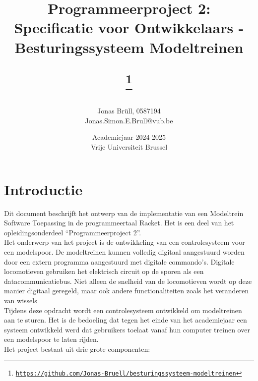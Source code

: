 \documentclass[a4paper, 11pt]{article}
\title{Programmeerproject 2:\\ Specificatie voor Ontwikkelaars - Besturingssysteem Modeltreinen		
	\author{Jonas Br\"ull, 0587194\\ Jonas.Simon.E.Brull@vub.be\\}
	\date{Academiejaar 2024-2025\\Vrije Universiteit Brussel}
	\thanks{\texttt{\url{https://github.com/Jonas-Bruell/besturingssysteem-modeltreinen}}}
}
\newcommand{\<}{\scriptsize\textless\normalsize}
\renewcommand{\>}{\scriptsize\textgreater\normalsize}
\begin{document}
\maketitle
\newpage

\tableofcontents
\newpage

\pagestyle{fancy}
\setcounter{page}{1}

\section{Introductie} %
Dit document beschrijft het ontwerp van de implementatie van een Modeltrein Software Toepassing in de programmeertaal Racket. Het is een deel van het opleidingsonderdeel ``Programmeerproject 2''.\\
\newline
Het onderwerp van het project is de ontwikkeling van een controlesysteem voor een modelspoor. De modeltreinen kunnen volledig digitaal aangestuurd worden door een extern programma aangestuurd met digitale commando’s. Digitale locomotieven gebruiken het elektrisch circuit op de sporen als een datacommunicatiebus. Niet alleen de snelheid van de locomotieven wordt op deze manier digitaal
geregeld, maar ook andere functionaliteiten zoals het veranderen van wissels\\
\newline
Tijdens deze opdracht wordt een controlesysteem ontwikkeld om modeltreinen aan te sturen. Het is de
bedoeling dat tegen het einde van het academiejaar een systeem ontwikkeld werd dat gebruikers
toelaat vanaf hun computer treinen over een modelspoor te laten rijden.\\
\newline
Het project bestaat uit drie grote componenten:
\end{document}
